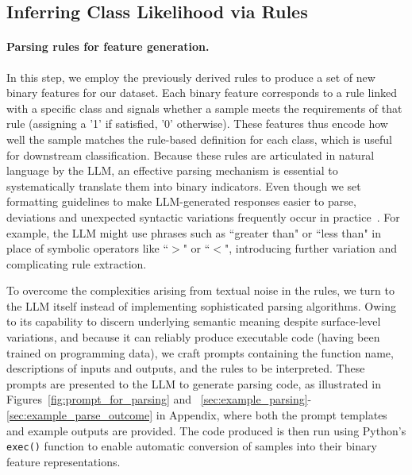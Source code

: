 \subsection{Inferring Class Likelihood via Rules}
\label{Sec:training}

\paragraph{Parsing rules for feature generation.} In this step, we employ the previously derived rules to produce a set of new binary features for our dataset. Each binary feature corresponds to a rule linked with a specific class and signals whether a sample meets the requirements of that rule (assigning a '1' if satisfied, '0' otherwise). These features thus encode how well the sample matches the rule-based definition for each class, which is useful for downstream classification. Because these rules are articulated in natural language by the LLM, an effective parsing mechanism is essential to systematically translate them into binary indicators. Even though we set formatting guidelines to make LLM-generated responses easier to parse, deviations and unexpected syntactic variations frequently occur in practice~\cite{kovavc2023large}. For example, the LLM might use phrases such as ``greater than" or ``less than" in place of symbolic operators like ``$>$" or ``$<$", introducing further variation and complicating rule extraction.

To overcome the complexities arising from textual noise in the rules, we turn to the LLM itself instead of implementing sophisticated parsing algorithms. Owing to its capability to discern underlying semantic meaning despite surface-level variations, and because it can reliably produce executable code (having been trained on programming data), we craft prompts containing the function name, descriptions of inputs and outputs, and the rules to be interpreted. These prompts are presented to the LLM to generate parsing code, as illustrated in Figures~\ref{fig:prompt_for_parsing} and ~\ref{sec:example_parsing}-\ref{sec:example_parse_outcome} in Appendix, where both the prompt templates and example outputs are provided. The code produced is then run using Python’s \texttt{exec()} function to enable automatic conversion of samples into their binary feature representations.

\vspace*{-0.12in}
